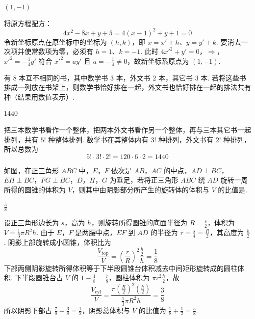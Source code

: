 \documentclass[UTF8,a4paper,oneside,11pt]{ctexbook}
\begin{document}
\begin{answer}
\((1,-1)\)
\end{answer}

\begin{solution}
将原方程配方：
\[
4x^2-8x+y+5=4(x-1)^2+y+1=0
\]
令新坐标原点在原坐标中的坐标为 \((h,k)\)，即 \(x=x'+h\)、\(y=y'+k\). 要消去一次项并使常数项为零，必须有 \(h=1\)、\(k=-1\). 此时
\(4x'^2+y'=0\)，\(\Longrightarrow\)，\(x'^2=-\frac{1}{4}y'\)
符合 \(x'^2=ay'\) 且 \(a=-\frac{1}{4}\neq0\)，故新坐标系原点为 \((1,-1)\).
\end{solution}

\begin{problem}[A]
有 \(8\) 本互不相同的书，其中数学书 \(3\) 本，外文书 \(2\) 本，其它书 \(3\) 本. 若将这些书排成一列放在书架上，则数学书恰好排在一起，外文书也恰好排在一起的排法共有\fillinblank{}种（结果用数值表示）.
\end{problem}

\begin{answer}
\(1440\)
\end{answer}

\begin{solution}
把三本数学书看作一个整体，把两本外文书看作另一个整体，再与三本其它书一起排列，共有 \(5!\) 种整体排列. 数学书在其整体内有 \(3!\) 种排列，外文书有 \(2!\) 种排列，所以总数为
\[
5!\cdot3!\cdot2!=120\cdot6\cdot2=1440
\]
\end{solution}

\begin{problem}[A]
如图，在正三角形 \(ABC\) 中，\(E\)，\(F\) 依次是 \(AB\)，\(AC\) 的中点，\(AD \perp BC\)，\(EH \perp BC\)，\(FG \perp BC\)，\(D\)，\(H\)，\(G\) 为垂足，若将正三角形 \(ABC\) 绕 \(AD\) 旋转一周所得的圆锥的体积为 \(V\)，则其中由阴影部分所产生的旋转体的体积与 \(V\) 的比值是\fillinblank{}.

\end{problem}

\begin{answer}
\(\frac{5}{8}\)
\end{answer}

\begin{solution}
设正三角形边长为 \(s\)，高为 \(h\)，则旋转所得圆锥的底面半径为 \(R=\frac{s}{2}\)，体积为 \(V=\frac{1}{3}\pi R^2h\). 由于 \(E\)，\(F\) 是两腰中点，\(EF\) 到 \(AD\) 的半径为 \(r=\frac{s}{4}=\frac{R}{2}\)，其高度为 \(\frac{h}{2}\). 阴影上部旋转成小圆锥，体积比为
\[
\frac{V_{\mathrm{top}}}{V}=\left(\frac{r}{R}\right)^2\frac{\frac{h}{2}}{h}=\frac{1}{8}
\]
下部两侧阴影旋转所得体积等于下半段圆锥台体积减去中间矩形旋转成的圆柱体积. 下半段圆锥台占 \(V\) 的 \(1-\frac18=\frac78\)，圆柱体积为 \(\pi r^2\frac{h}{2}\)，故
\[
\frac{V_{\mathrm{cyl}}}{V}=\frac{\pi(\frac{R}{2})^2(\frac{h}{2})}{\frac13\pi R^2h}=\frac38
\]
所以阴影下部占 \(\frac78-\frac38=\frac12\)，阴影总体积与 \(V\) 的比值为 \(\frac18+\frac12=\frac58\).
\end{solution}
\end{document}
